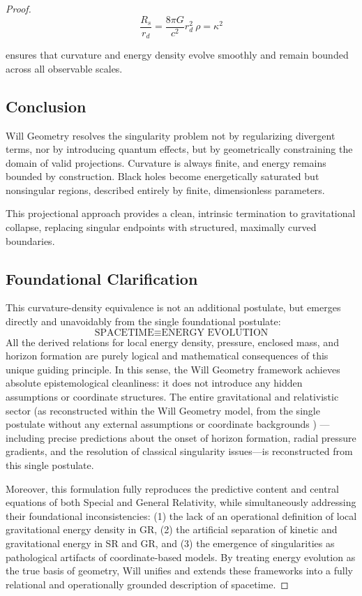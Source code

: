 \documentclass{article}
\begin{document}
\begin{proof}
\[
\frac{R_{s}}{r_{d}}=\frac{8\pi G}{c^{2}}r_{d}^{2}\ \rho=\kappa^{2}
\]

ensures that curvature and energy density evolve smoothly and remain bounded across all observable scales.

\subsection*{Conclusion}

Will Geometry resolves the singularity problem not by regularizing divergent terms, nor by introducing quantum effects, but by geometrically constraining the domain of valid projections. Curvature is always finite, and energy remains bounded by construction. Black holes become energetically saturated but nonsingular regions, described entirely by finite, dimensionless parameters.

This projectional approach provides a clean, intrinsic termination to gravitational collapse, replacing singular endpoints with structured, maximally curved boundaries.

\subsection*{Foundational Clarification}

This curvature-density equivalence is not an additional postulate, but emerges directly and unavoidably from the single foundational postulate:
\[
\boxed{\text{SPACETIME} \equiv \text{ENERGY EVOLUTION}}
\]
All the derived relations for local energy density, pressure, enclosed mass, and horizon formation are purely logical and mathematical consequences of this unique guiding principle. In this sense, the Will Geometry framework achieves absolute epistemological cleanliness: it does not introduce any hidden assumptions or coordinate structures. The entire gravitational and relativistic sector (as reconstructed within the Will Geometry model, from the single postulate without any external assumptions or coordinate backgrounds ) — including precise predictions about the onset of horizon formation, radial pressure gradients, and the resolution of classical singularity issues—is reconstructed from this single postulate.

Moreover, this formulation fully reproduces the predictive content and central equations of both Special and General Relativity, while simultaneously addressing their foundational inconsistencies: (1) the lack of an operational definition of local gravitational energy density in GR, (2) the artificial separation of kinetic and gravitational energy in SR and GR, and (3) the emergence of singularities as pathological artifacts of coordinate-based models. By treating energy evolution as the true basis of geometry, Will unifies and extends these frameworks into a fully relational and operationally grounded description of spacetime.


\end{proof}
\end{document}
